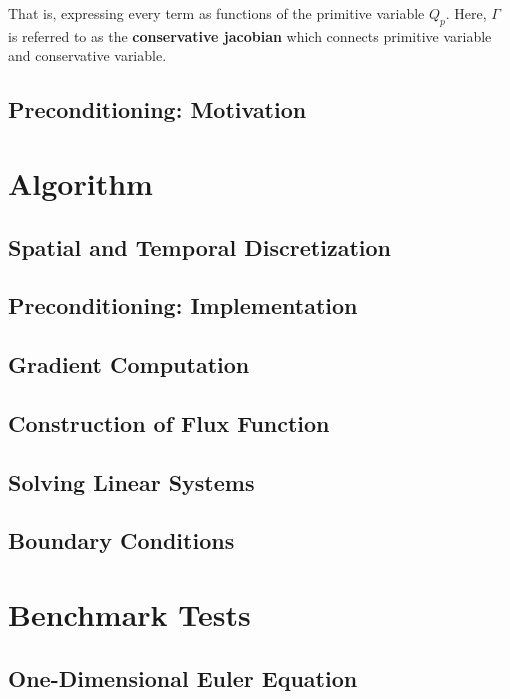 \documentclass[11pt, letterpaper]{report}
\begin{document}
That is, expressing every term as functions of the primitive variable $Q_p$. Here, $\Gamma$ is referred
to as the {\bf conservative jacobian} which connects primitive variable and conservative variable.
\paraspace


\section{Preconditioning: Motivation}

\chapter{Algorithm}

\section{Spatial and Temporal Discretization}

\section{Preconditioning: Implementation}

\section{Gradient Computation}

\section{Construction of Flux Function}

\section{Solving Linear Systems}

\section{Boundary Conditions}

\chapter{Benchmark Tests}

\section{One-Dimensional Euler Equation}
\end{document}
